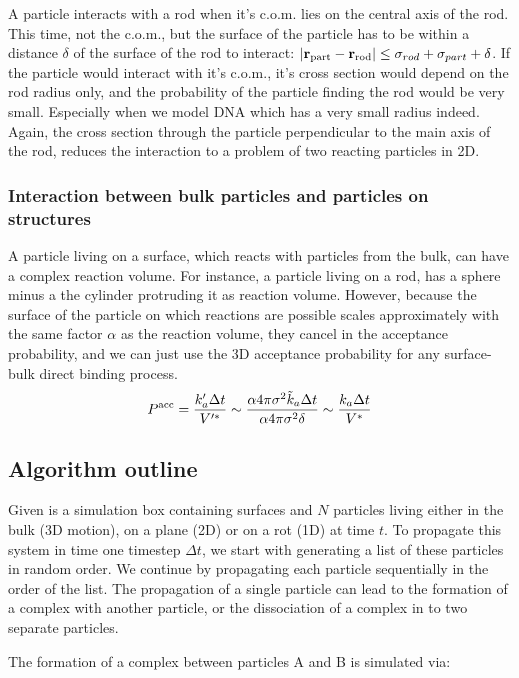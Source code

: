 A particle interacts with a rod when it's c.o.m. lies on the central axis of the rod. This time, not the c.o.m., but the surface of the particle has to be within a distance $\delta$ of the surface of the rod to interact: $|{\bf r}_{\rm part}-{\bf r}_{\rm rod}| \leq \sigma_{rod}+\sigma_{part} + \delta $. If the particle would interact with it's c.o.m., it's cross section would depend on the rod radius only, and the probability of the particle finding the rod would be very small. Especially when we model DNA which has a very small radius indeed. Again, the cross section through the particle perpendicular to the main axis of the rod, reduces the interaction to a problem of two reacting particles in 2D. 

\subsubsection{Interaction between bulk particles and particles on structures}
A particle living on a surface, which reacts with particles from the bulk, can have a complex reaction volume. For instance, a particle living on a rod, has a sphere minus a the cylinder protruding it as reaction volume. However, because the surface of the particle on which reactions are possible scales approximately with the same factor $\alpha$ as the reaction volume, they cancel in the acceptance probability, and we can just use the 3D acceptance probability for any surface-bulk direct binding process.
\begin{equation}
 P^{\rm acc} = \frac{k'_a \Delta t}{V'^*} \sim \frac{ \alpha 4 \pi \sigma^2 \tilde{k}_a \Delta t}{\alpha 4 \pi \sigma^2 \delta} \sim \frac{k_a \Delta t}{V^*}
\end{equation}


\subsection{Algorithm outline}
Given is a simulation box containing surfaces and $N$ particles living either in the bulk (3D motion), on a plane (2D) or on a rot (1D) at time $t$. To propagate this system in time one timestep $\Delta t$, we start with generating a list of these particles in random order. We continue by propagating each particle sequentially in the order of the list. The propagation of a single particle can lead to the formation of a complex with another particle, or the dissociation of a complex in to two separate particles. 

The formation of a complex between particles A and B is simulated via:


